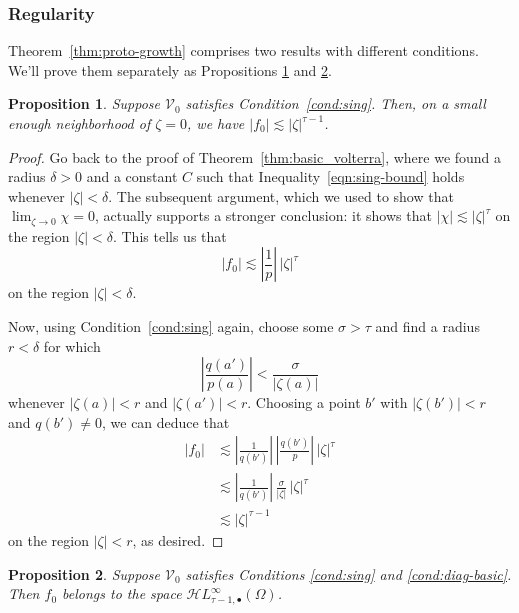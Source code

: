\documentclass{article}
\theoremstyle{plain}
\newtheorem{prop}{Proposition}
\newcommand{\singexp}[2]{\mathcal{H}L^\infty_{#1, #2}}
\newcommand{\singexpalg}[1]{\singexp{#1}{\bullet}}
\newcommand{\hardpart}{\mathcal{V}_0}
\newcommand{\solproto}{f_0}
\newcommand{\domain}{\Omega}
\begin{document}
\subsubsection{Regularity}\label{sec:asymptotics}
Theorem~\ref{thm:proto-growth} comprises two results with different conditions. We'll prove them separately as Propositions \ref{prop:asymptotic at zero} and \ref{prop:asymptotic at infinity}.
\begin{prop}\label{prop:asymptotic at zero}
Suppose $\hardpart$ satisfies {\em Condition~\eqref{cond:sing}}. Then, on a small enough neighborhood of $\zeta = 0$, we have $|\solproto| \lesssim |\zeta|^{\tau-1}$.
\end{prop}

\begin{proof}
Go back to the proof of Theorem~\ref{thm:basic_volterra}, where we found a radius $\delta > 0$ and a constant $C$ such that Inequality~\eqref{eqn:sing-bound} holds whenever $|\zeta| < \delta$. The subsequent argument, which we used to show that $\lim_{\zeta \to 0} \chi = 0$, actually supports a stronger conclusion: it shows that $|\chi| \lesssim |\zeta|^\tau$ on the region $|\zeta| < \delta$. This tells us that
\[ |\solproto| \lesssim \left|\frac{1}{p}\right|\,|\zeta|^\tau \]
on the region $|\zeta| < \delta$.

Now, using Condition~\eqref{cond:sing} again, choose some $\sigma > \tau$ and find a radius $r < \delta$ for which
\[ \left|\frac{q(a')}{p(a)}\right| < \frac{\sigma}{|\zeta(a)|} \]
whenever $|\zeta(a)| < r$ and $|\zeta(a')| < r$. Choosing a point $b'$ with $|\zeta(b')| < r$ and $q(b') \neq 0$, we can deduce that
\begin{align*}
|\solproto| & \lesssim \left|\frac{1}{q(b')}\right|\,\left|\frac{q(b')}{p}\right|\,|\zeta|^\tau \\
& \lesssim \left|\frac{1}{q(b')}\right|\,\frac{\sigma}{|\zeta|}\,|\zeta|^\tau \\
& \lesssim |\zeta|^{\tau-1}
\end{align*}
on the region $|\zeta| < r$, as desired.
\end{proof}
\begin{prop}\label{prop:asymptotic at infinity}
Suppose $\hardpart$ satisfies {\em Conditions \eqref{cond:sing}} and \textcolor{brown}{\eqref{cond:diag-basic}}. Then $\solproto$ belongs to the space $\singexpalg{\tau-1}(\domain)$.
\end{prop}
\end{document}
